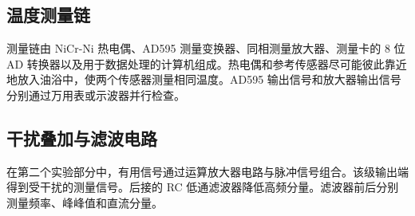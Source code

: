 \subsection{温度测量链}

测量链由 NiCr-Ni 热电偶、AD595 测量变换器、同相测量放大器、测量卡的 8 位 AD 转换器以及用于数据处理的计算机组成。热电偶和参考传感器尽可能彼此靠近地放入油浴中，使两个传感器测量相同温度。AD595 输出信号和放大器输出信号分别通过万用表或示波器并行检查。

\subsection{干扰叠加与滤波电路}

在第二个实验部分中，有用信号通过运算放大器电路与脉冲信号组合。该级输出端得到受干扰的测量信号。后接的 RC 低通滤波器降低高频分量。滤波器前后分别测量频率、峰峰值和直流分量。
